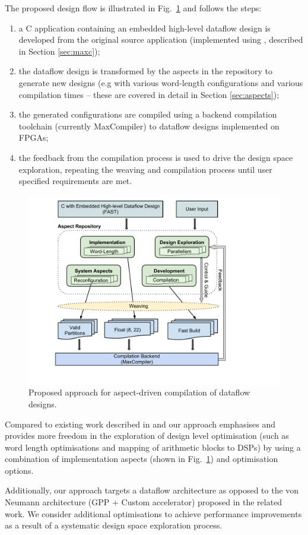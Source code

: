 The proposed design flow is illustrated in Fig.~\ref{fig:design-flow}
and follows the steps:
\begin{enumerate}
\item a C application containing an embedded high-level dataflow
  design is developed from the original source application
  (implemented using \MAXC{}, described in Section \ref{sec:maxc});
\item the dataflow design is transformed by the aspects in the
  repository to generate new designs (e.g with various word-length
  configurations and various compilation times -- these are covered in
  detail in Section \ref{sec:aspects});
\item the generated configurations are compiled using a backend
  compilation toolchain (currently MaxCompiler) to dataflow designs
  implemented on FPGAs;
\item the feedback from the compilation process is used to drive the
  design space exploration, repeating the weaving and compilation
  process until user specified requirements are met.
\end{enumerate}

\begin{figure}[!h]
  \includegraphics[scale=0.5, trim=60 50 0 0]{figs/design-flow}
  \caption{Proposed approach for aspect-driven compilation of dataflow
    designs.}
  \label{fig:design-flow}
\end{figure}

Compared to existing work described in
\cite{Cardoso:Teixeira:Alves:Nobre:Diniz:Cutinho:Luk:2012} and
\cite{cardoso2011new} our approach emphasises and provides more
freedom in the exploration of design level optimisation (such as word
length optimisations and mapping of arithmetic blocks to DSPs) by
using a combination of implementation aspects (shown in
Fig.~\ref{fig:design-flow}) and \MAXC{} optimisation options.

Additionally, our approach targets a dataflow architecture as opposed
to the von Neumann architecture (GPP + Custom accelerator) proposed in
the related work. We consider additional optimisations to achieve
performance improvements as a result of a systematic design space
exploration process.
